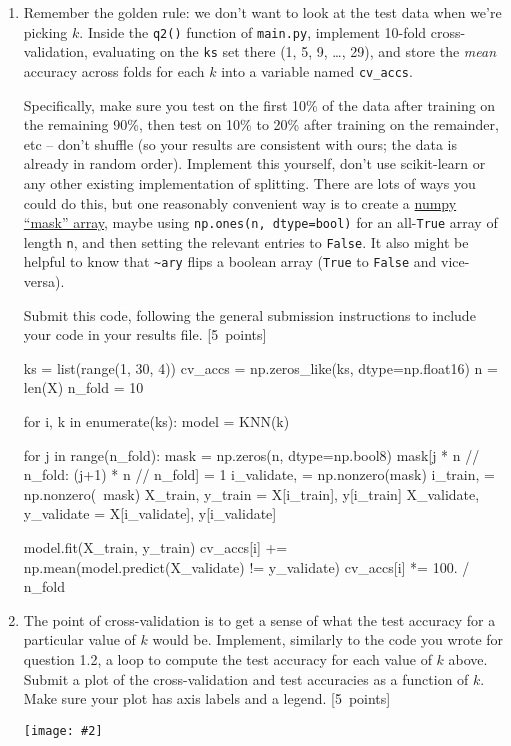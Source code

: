 \documentclass{article}
\newcommand{\blu}[1]{{\textcolor{blu}{#1}}}
\let\ask\blu
\newcommand\pts[1]{\textcolor{pointscolour}{[#1~points]}}
\newcommand{\centerfig}[2]{\begin{center}\texttt{[image: \#2]}\end{center}}
\begin{document}
    \begin{enumerate}
        \item Remember the golden rule: we don't want to look at the test data when we're picking $k$. Inside the \texttt{q2()} function of \texttt{main.py}, implement 10-fold cross-validation, evaluating on the \texttt{ks} set there (1, 5, 9, \dots, 29), and store the \emph{mean} accuracy across folds for each $k$ into a variable named \texttt{cv\_accs}.

        Specifically, make sure you test on the first 10\% of the data after training on the remaining 90\%, then test on 10\% to 20\% after training on the remainder, etc -- don't shuffle (so your results are consistent with ours; the data is already in random order). Implement this yourself, don't use scikit-learn or any other existing implementation of splitting. There are lots of ways you could do this, but one reasonably convenient way is to create a \href{https://numpy.org/doc/stable/user/basics.indexing.html#boolean-or-mask-index-arrays}{numpy ``mask'' array}, maybe using \texttt{np.ones(n, dtype=bool)} for an all-\texttt{True} array of length \texttt{n}, and then setting the relevant entries to \texttt{False}. It also might be helpful to know that \texttt{\textasciitilde ary} flips a boolean array (\texttt{True} to \texttt{False} and vice-versa).

        \ask{Submit this code}, following the general submission instructions to include your code in your results file. \pts{5}
        \begin{python}
ks = list(range(1, 30, 4))
cv_accs = np.zeros_like(ks, dtype=np.float16)
n = len(X)
n_fold = 10

for i, k in enumerate(ks):
    model = KNN(k)

    for j in range(n_fold):
        mask = np.zeros(n, dtype=np.bool8)
        mask[j * n // n_fold: (j+1) * n // n_fold] = 1
        i_validate, = np.nonzero(mask)
        i_train, = np.nonzero(~mask)
        X_train, y_train = X[i_train], y[i_train]
        X_validate, y_validate = X[i_validate], y[i_validate]

        model.fit(X_train, y_train)
        cv_accs[i] += np.mean(model.predict(X_validate) != y_validate)
    cv_accs[i] *= 100. / n_fold
        \end{python}

        \item The point of cross-validation is to get a sense of what the test accuracy for a particular value of $k$ would be. Implement, similarly to the code you wrote for question 1.2, a loop to compute the test accuracy for each value of $k$ above. \ask{Submit a plot of the cross-validation and test accuracies as a function of $k$.} Make sure your plot has axis labels and a legend. \pts{5}
        \centerfig{0.6}{figs/2_test_error}


\end{enumerate}
\end{document}

